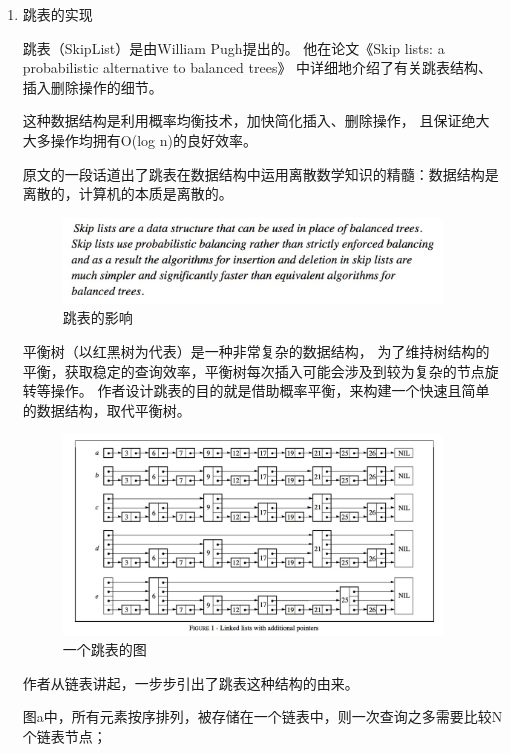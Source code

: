 		\begin{enumerate}
		\item 跳表的实现
		
		跳表（SkipList）是由William Pugh提出的。
		他在论文《Skip lists: a probabilistic alternative to balanced trees》
		中详细地介绍了有关跳表结构、插入删除操作的细节。

		这种数据结构是利用概率均衡技术，加快简化插入、删除操作，
		且保证绝大大多操作均拥有O(log n)的良好效率。
		
		原文的一段话道出了跳表在数据结构中运用离散数学知识的精髓：数据结构是离散的，计算机的本质是离散的。

		\begin{figure}[H]
			\centering
			\includegraphics[width=0.95\textwidth]{images/skiplist_effect}
			\caption{跳表的影响}
			\label{skiplist_effect}
		\end{figure}

		平衡树（以红黑树为代表）是一种非常复杂的数据结构，
		为了维持树结构的平衡，获取稳定的查询效率，平衡树每次插入可能会涉及到较为复杂的节点旋转等操作。
		作者设计跳表的目的就是借助概率平衡，来构建一个快速且简单的数据结构，取代平衡树。

		\begin{figure}[H]
			\centering
			\includegraphics[width=0.95\textwidth]{images/skiplist_intro}
			\caption{一个跳表的图}
			\label{skiplist_intro}
		\end{figure}

		作者从链表讲起，一步步引出了跳表这种结构的由来。

		图a中，所有元素按序排列，被存储在一个链表中，则一次查询之多需要比较N个链表节点；


\end{enumerate}
